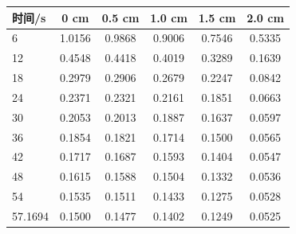 \begin{tabular}{lccccc}
\toprule
时间/s & 0 cm & 0.5 cm & 1.0 cm & 1.5 cm & 2.0 cm \\
\midrule
6 & 1.0156 & 0.9868 & 0.9006 & 0.7546 & 0.5335 \\
12 & 0.4548 & 0.4418 & 0.4019 & 0.3289 & 0.1639 \\
18 & 0.2979 & 0.2906 & 0.2679 & 0.2247 & 0.0842 \\
24 & 0.2371 & 0.2321 & 0.2161 & 0.1851 & 0.0663 \\
30 & 0.2053 & 0.2013 & 0.1887 & 0.1637 & 0.0597 \\
36 & 0.1854 & 0.1821 & 0.1714 & 0.1500 & 0.0565 \\
42 & 0.1717 & 0.1687 & 0.1593 & 0.1404 & 0.0547 \\
48 & 0.1615 & 0.1588 & 0.1504 & 0.1332 & 0.0536 \\
54 & 0.1535 & 0.1511 & 0.1433 & 0.1275 & 0.0528 \\
57.1694 & 0.1500 & 0.1477 & 0.1402 & 0.1249 & 0.0525 \\
\bottomrule
\end{tabular}
